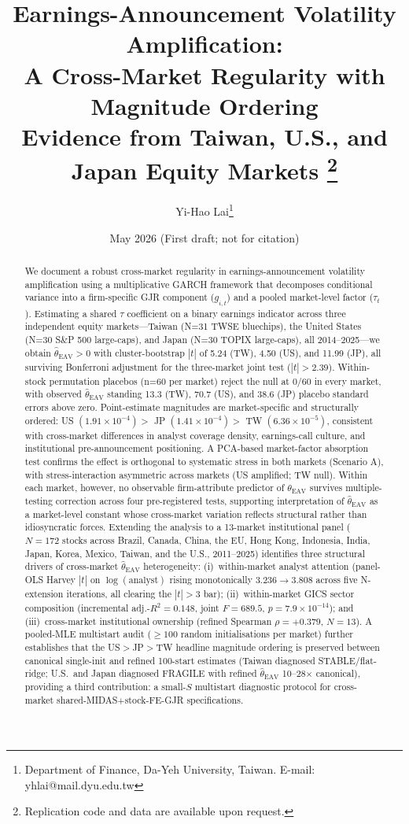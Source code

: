 \documentclass[12pt,a4paper]{article}
\title{%
Earnings-Announcement Volatility Amplification:\\
A Cross-Market Regularity with Magnitude Ordering\\[0.5em]
\large Evidence from Taiwan, U.S., and Japan Equity Markets%
\thanks{Replication code and data are available upon request.}}
\author{Yi-Hao Lai\thanks{%
Department of Finance, Da-Yeh University, Taiwan.
E-mail: yhlai@mail.dyu.edu.tw}}
\date{May 2026 \quad (First draft; not for citation)}
\begin{document}
\maketitle

\begin{abstract}
\noindent
We document a robust cross-market regularity in earnings-announcement volatility
amplification using a multiplicative GARCH framework that decomposes conditional
variance into a firm-specific GJR component ($g_{i,t}$) and a pooled market-level
factor ($\tau_t$). Estimating a shared $\tau$ coefficient on a binary earnings
indicator across three independent equity markets---Taiwan (N=31 TWSE
bluechips), the United States (N=30 S\&P 500 large-caps), and Japan (N=30 TOPIX
large-caps), all 2014--2025---we obtain $\hat{\theta}_{\mathrm{EAV}} > 0$ with
cluster-bootstrap $|t|$ of 5.24 (TW), 4.50 (US), and 11.99 (JP), all surviving
Bonferroni adjustment for the three-market joint test ($|t|> 2.39$). Within-stock
permutation placebos (n=60 per market) reject the null at 0/60 in every market,
with observed $\hat{\theta}_{\mathrm{EAV}}$ standing 13.3 (TW), 70.7 (US), and
38.6 (JP) placebo standard errors above zero. Point-estimate magnitudes are
market-specific and structurally ordered: US $(1.91\times10^{-4})>$ JP
$(1.41\times10^{-4})>$ TW $(6.36\times10^{-5})$, consistent with cross-market
differences in analyst coverage density, earnings-call culture, and institutional
pre-announcement positioning. A PCA-based market-factor absorption test confirms
the effect is orthogonal to systematic stress in both markets (Scenario A), with
stress-interaction asymmetric across markets (US amplified; TW null). Within each
market, however, no observable firm-attribute predictor of $\theta_{\mathrm{EAV}}$
survives multiple-testing correction across four pre-registered tests, supporting
interpretation of $\hat{\theta}_{\mathrm{EAV}}$ as a market-level constant whose
cross-market variation reflects structural rather than idiosyncratic forces.
Extending the analysis to a 13-market institutional panel ($N = 172$ stocks across
Brazil, Canada, China, the EU, Hong Kong, Indonesia, India, Japan, Korea, Mexico,
Taiwan, and the U.S., 2011--2025) identifies three structural drivers of
cross-market $\hat{\theta}_{\mathrm{EAV}}$ heterogeneity: (i)~within-market analyst
attention (panel-OLS Harvey $|t|$ on $\log(\mathrm{analyst})$ rising monotonically
$3.236 \to 3.808$ across five N-extension iterations, all clearing the
\citet{harvey2016} $|t| > 3$ bar); (ii)~within-market GICS sector composition
(incremental adj.-$R^2 = 0.148$, joint $F = 689.5$, $p = 7.9 \times 10^{-14}$);
and (iii)~cross-market institutional ownership (refined Spearman
$\rho = +0.379$, $N = 13$). A pooled-MLE multistart audit
($\geq 100$ random initialisations per market) further establishes that the
US$>$JP$>$TW headline magnitude ordering is preserved between canonical single-init
and refined 100-start estimates (Taiwan diagnosed STABLE/flat-ridge; U.S.\ and
Japan diagnosed FRAGILE with refined $\hat{\theta}_{\mathrm{EAV}}$ 10--28$\times$
canonical), providing a third contribution: a small-$S$ multistart diagnostic
protocol for cross-market shared-MIDAS$+$stock-FE-GJR specifications.


\end{abstract}
\end{document}
